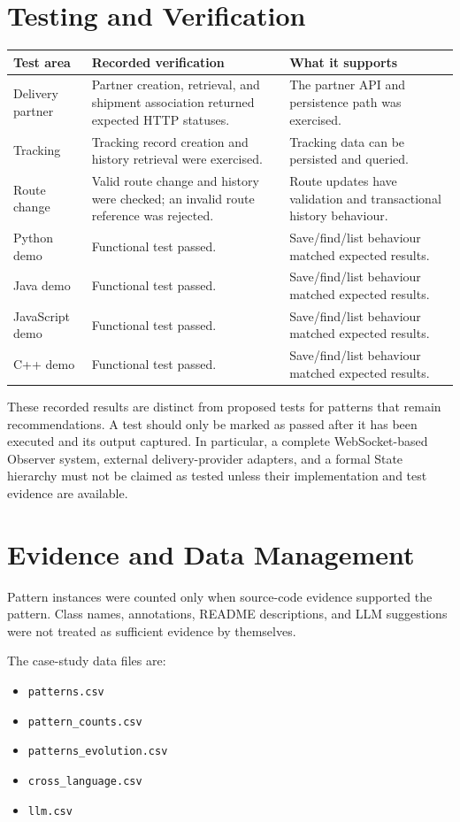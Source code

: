 \documentclass[12pt,a4paper]{article}
\begin{document}
\section{Testing and Verification}
\begin{longtable}{p{}p{}p{}}
\toprule
\textbf{Test area} & \textbf{Recorded verification} & \textbf{What it supports}\\
\midrule
Delivery partner & Partner creation, retrieval, and shipment association returned expected HTTP statuses. & The partner API and persistence path was exercised.\\
Tracking & Tracking record creation and history retrieval were exercised. & Tracking data can be persisted and queried.\\
Route change & Valid route change and history were checked; an invalid route reference was rejected. & Route updates have validation and transactional history behaviour.\\
Python demo & Functional test passed. & Save/find/list behaviour matched expected results.\\
Java demo & Functional test passed. & Save/find/list behaviour matched expected results.\\
JavaScript demo & Functional test passed. & Save/find/list behaviour matched expected results.\\
C++ demo & Functional test passed. & Save/find/list behaviour matched expected results.\\
\bottomrule
\end{longtable}

These recorded results are distinct from proposed tests for patterns that remain recommendations. A test should only be marked as passed after it has been executed and its output captured. In particular, a complete WebSocket-based Observer system, external delivery-provider adapters, and a formal State hierarchy must not be claimed as tested unless their implementation and test evidence are available.

\section{Evidence and Data Management}
Pattern instances were counted only when source-code evidence supported the pattern. Class names, annotations, README descriptions, and LLM suggestions were not treated as sufficient evidence by themselves.

The case-study data files are:
\begin{itemize}
    \item \texttt{patterns.csv}
    \item \texttt{pattern\_counts.csv}
    \item \texttt{patterns\_evolution.csv}
    \item \texttt{cross\_language.csv}
    \item \texttt{llm.csv}
\end{itemize}
\end{document}
